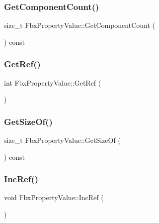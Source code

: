 \subsubsection{\texorpdfstring{Get\+Component\+Count()}{GetComponentCount()}}
{\footnotesize\ttfamily size\+\_\+t Fbx\+Property\+Value\+::\+Get\+Component\+Count (\begin{DoxyParamCaption}{ }\end{DoxyParamCaption}) const}

\mbox{\label{class_fbx_property_value_a246b30c1a051700fcdb6f20c07684f13}} 
\subsubsection{\texorpdfstring{Get\+Ref()}{GetRef()}}
{\footnotesize\ttfamily int Fbx\+Property\+Value\+::\+Get\+Ref (\begin{DoxyParamCaption}{ }\end{DoxyParamCaption})}

\mbox{\label{class_fbx_property_value_acdfbe806104be54674133d40bf604df5}} 
\subsubsection{\texorpdfstring{Get\+Size\+Of()}{GetSizeOf()}}
{\footnotesize\ttfamily size\+\_\+t Fbx\+Property\+Value\+::\+Get\+Size\+Of (\begin{DoxyParamCaption}{ }\end{DoxyParamCaption}) const}

\mbox{\label{class_fbx_property_value_a2941cded4b8794c26d25019c08710cee}} 
\subsubsection{\texorpdfstring{Inc\+Ref()}{IncRef()}}
{\footnotesize\ttfamily void Fbx\+Property\+Value\+::\+Inc\+Ref (\begin{DoxyParamCaption}{ }\end{DoxyParamCaption})}

